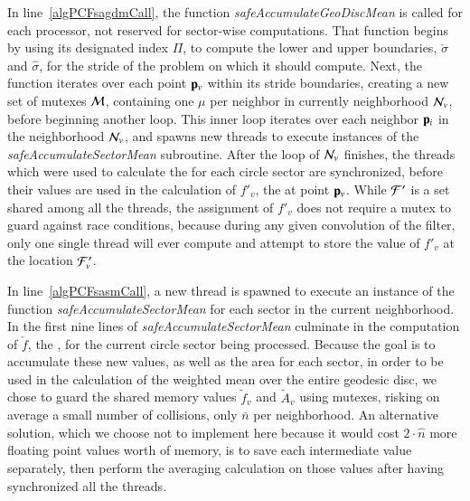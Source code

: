 In line~\ref{algPCFsagdmCall}, the function \textit{safeAccumulateGeoDiscMean} is called for each processor, not reserved for sector-wise computations. That function begins by using its designated index $\Pi$, to compute the lower and upper boundaries, $\check{\sigma}$ and $\hat{\sigma}$, for the stride of the problem on which it should compute. Next, the function iterates over each point $\mathbf{p}_v$ within its stride boundaries, creating a new set of mutexes $\mathcal{M}$, containing one $\mu$ per neighbor in currently neighborhood $\mathcal{N}_v$, before beginning another loop. This inner loop iterates over each neighbor $\mathbf{p}_i$ in the neighborhood $\mathcal{N}_v$, and spawns new threads to execute instances of the \textit{safeAccumulateSectorMean} subroutine. After the loop of $\mathcal{N}_v$ finishes, the threads which were used to calculate the  for each circle sector are synchronized, before their values are used in the calculation of $f'_v$, the \wmfv{} at point $\mathbf{p}_v$. While $\mathcal{F}'$ is a set shared among all the threads, the assignment of $f'_v$ does not require a mutex to guard against race conditions, because during any given convolution of the filter, only one single thread will ever compute and attempt to store the value of $f'_v$ at the location $\mathcal{F}'_v$.

In line~\ref{algPCFsasmCall}, a new thread is spawned to execute an instance of the function \textit{safeAccumulateSectorMean} for each sector in the current neighborhood. In the first nine lines of \textit{safeAccumulateSectorMean} culminate in the computation of $\check{f}$, the \wmfv{}, for the current circle sector being processed. Because the goal is to accumulate these new values, as well as the area for each sector, in order to be used in the calculation of the weighted mean over the entire geodesic disc, we chose to guard the shared memory values $\tilde{f}_v$ and $\tilde{A}_v$ using mutexes, risking on average a small number of collisions, only $\bar{n}$ per neighborhood. An alternative solution, which we choose not to implement here because it would cost $2\cdot\hat{n}$ more floating point values worth of memory, is to save each intermediate value separately, then perform the averaging calculation on those values after having synchronized all the threads.

